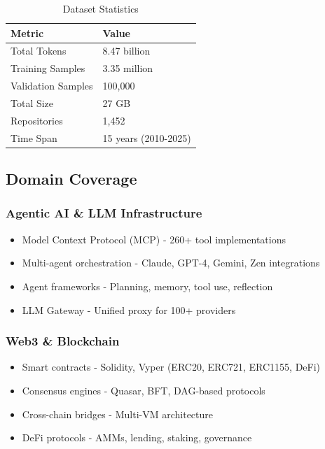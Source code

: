 \documentclass[11pt,a4paper]{article}
\begin{document}
\begin{table}[H]
\centering
\begin{tabular}{ll}
\toprule
\textbf{Metric} & \textbf{Value} \\
\midrule
Total Tokens & 8.47 billion \\
Training Samples & 3.35 million \\
Validation Samples & 100,000 \\
Total Size & 27 GB \\
Repositories & 1,452 \\
Time Span & 15 years (2010-2025) \\
\bottomrule
\end{tabular}
\caption{Dataset Statistics}
\end{table}

\subsection{Domain Coverage}

\subsubsection{Agentic AI \& LLM Infrastructure}
\begin{itemize}
    \item Model Context Protocol (MCP) - 260+ tool implementations
    \item Multi-agent orchestration - Claude, GPT-4, Gemini, Zen integrations
    \item Agent frameworks - Planning, memory, tool use, reflection
    \item LLM Gateway - Unified proxy for 100+ providers
\end{itemize}

\subsubsection{Web3 \& Blockchain}
\begin{itemize}
    \item Smart contracts - Solidity, Vyper (ERC20, ERC721, ERC1155, DeFi)
    \item Consensus engines - Quasar, BFT, DAG-based protocols
    \item Cross-chain bridges - Multi-VM architecture
    \item DeFi protocols - AMMs, lending, staking, governance
\end{itemize}
\end{document}
